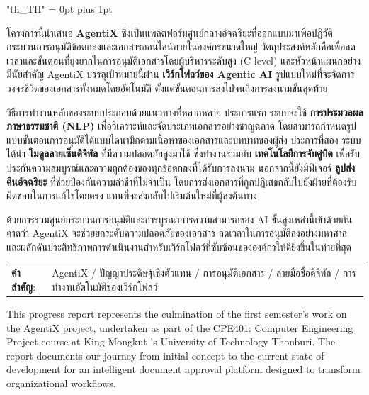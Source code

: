 \documentclass[12pt,oneside,openright,a4paper]{cpe-english-project}
\begin{document}
\newpage
{
\XeTeXlinebreaklocale "th_TH"
\XeTeXlinebreakskip = 0pt plus 1pt
\thaifont
\thaiabstract

โครงการนี้นำเสนอ \textbf{AgentiX} ซึ่งเป็นแพลตฟอร์มศูนย์กลางอัจฉริยะที่ออกแบบมาเพื่อปฏิวัติกระบวนการอนุมัติข้อตกลงและเอกสารออนไลน์ภายในองค์กรขนาดใหญ่ วัตถุประสงค์หลักคือเพื่อลดเวลาและขั้นตอนที่ยุ่งยากในการอนุมัติเอกสารโดยผู้บริหารระดับสูง (C-level) และหัวหน้าแผนกอย่างมีนัยสำคัญ AgentiX บรรลุเป้าหมายนี้ผ่าน \textbf{เวิร์กโฟลว์ของ Agentic AI} รูปแบบใหม่ที่จะจัดการวงจรชีวิตของเอกสารทั้งหมดโดยอัตโนมัติ ตั้งแต่ขั้นตอนการส่งไปจนถึงการลงนามขั้นสุดท้าย

วิธีการทำงานหลักของระบบประกอบด้วยแนวทางที่หลากหลาย ประการแรก ระบบจะใช้ \textbf{การประมวลผลภาษาธรรมชาติ (NLP)} เพื่อวิเคราะห์และจัดประเภทเอกสารอย่างชาญฉลาด โดยสามารถกำหนดรูปแบบขั้นตอนการอนุมัติได้แบบไดนามิกตามเนื้อหาของเอกสารและบทบาทของผู้ส่ง ประการที่สอง ระบบได้นำ \textbf{โมดูลลายเซ็นดิจิทัล} ที่มีความปลอดภัยสูงมาใช้ ซึ่งทำงานร่วมกับ \textbf{เทคโนโลยีการจับคู่บิต} เพื่อรับประกันความสมบูรณ์และความถูกต้องของทุกข้อตกลงที่ได้รับการลงนาม นอกจากนี้ยังมีฟีเจอร์ \textbf{ลูปส่งคืนอัจฉริยะ} ที่ช่วยป้องกันความล่าช้าที่ไม่จำเป็น โดยการส่งเอกสารที่ถูกปฏิเสธกลับไปยังฝ่ายที่ต้องรับผิดชอบในการแก้ไขโดยตรง แทนที่จะส่งกลับไปเริ่มต้นใหม่ที่ผู้ส่งต้นทาง

ด้วยการรวมศูนย์กระบวนการอนุมัติและการบูรณาการความสามารถของ AI ขั้นสูงเหล่านี้เข้าด้วยกัน คาดว่า AgentiX จะช่วยยกระดับความปลอดภัยของเอกสาร ลดเวลาในการอนุมัติลงอย่างมหาศาล และผลักดันประสิทธิภาพการดำเนินงานสำหรับเวิร์กโฟลว์ที่ซับซ้อนขององค์กรให้ดียิ่งขึ้นในท้ายที่สุด

\begin{flushleft}
\begin{tabular*}{\textwidth}{@{}lp{}}
\textbf{คำสำคัญ}: & AgentiX / ปัญญาประดิษฐ์เชิงตัวแทน / การอนุมัติเอกสาร / ลายมือชื่อดิจิทัล / การทำงานอัตโนมัติของเวิร์กโฟลว์
\end{tabular*}
\end{flushleft}
\endabstract
}

\preface

This progress report represents the culmination of the first semester's work on the AgentiX project, undertaken as part of the CPE401: Computer Engineering Project course at King Mongkut 's University of Technology Thonburi. The report documents our journey from initial concept to the current state of development for an intelligent document approval platform designed to transform organizational workflows.

\vspace{1em}
\end{document}
